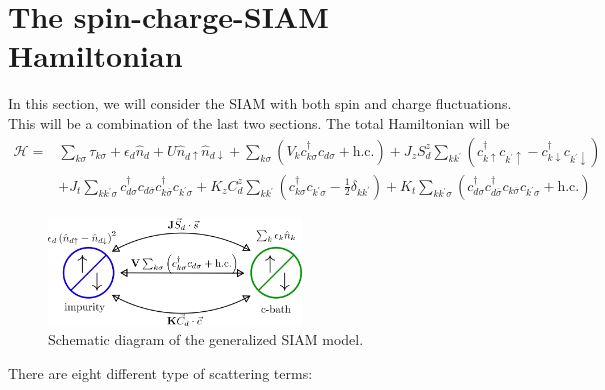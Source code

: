 \documentclass[twoside]{report}
\numberwithin{equation}{section}
\begin{document}
\section{The spin-charge-SIAM Hamiltonian}
In this section, we will consider the SIAM with both spin and charge fluctuations. This will be a combination of the last two sections. The total Hamiltonian will be
\begin{equation}\begin{aligned}
	\mathcal{H} =& \sum_{k\sigma}\tau_{k\sigma} + \epsilon_d \hat n_d + U \hat n_{d\uparrow}\hat n_{d \downarrow} + \sum_{k\sigma}\left( V_k c^\dagger_{k\sigma} c_{d\sigma} + \text{h.c.} \right) + J_z S_d^z\sum_{kk^\prime}\left( c^\dagger_{k \uparrow}c_{k^\prime \uparrow} - c^\dagger_{k \downarrow}c_{k^\prime \downarrow} \right) \\
	      &+ J_t \sum_{kk^\prime\sigma}c^\dagger_{d\sigma}c_{d\overline\sigma}c^\dagger_{k\overline\sigma}c_{k^\prime\sigma} + K_z C_d^z \sum_{kk^\prime}\left( c^\dagger_{k\sigma}c_{k^\prime\sigma} - \frac{1}{2}\delta_{kk^\prime} \right) + K_t \sum_{kk^\prime\sigma}\left(c^\dagger_{d\sigma}c^\dagger_{d\overline\sigma}c_{k\overline\sigma}c_{k^\prime\sigma}+\text{h.c.}\right)
\end{aligned}\end{equation}
\begin{figure}[htpb]
	\centering
	\includegraphics[width=0.6\textwidth]{../figures/gen_siam.png}
	\caption{Schematic diagram of the generalized SIAM model.}
\end{figure}
 There are eight different type of scattering terms:
\end{document}
